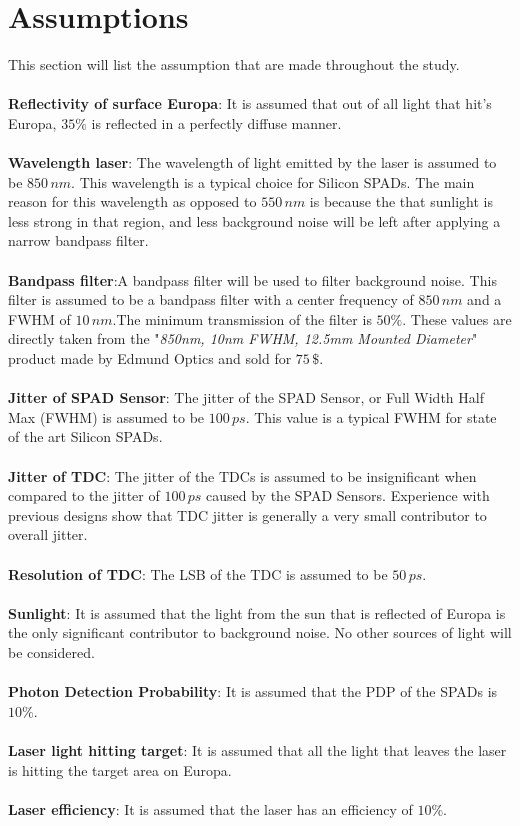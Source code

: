 \section{Assumptions} 
\label{ssec:assumptions}
This section will list the assumption that are made throughout the study.\\
\\
\textbf{Reflectivity of surface Europa}: It is assumed that out of all light that hit's Europa, $35\%$ is reflected in a perfectly diffuse manner.\\ 
\\
\textbf{Wavelength laser}: The wavelength of light emitted by the laser is assumed to be $850\,nm$. This wavelength is a typical choice for Silicon SPADs. The main reason for this wavelength as opposed to $550\,nm$ is because the that sunlight is less strong in that region, and less background noise will be left after applying a narrow bandpass filter. \\
\\
\textbf{Bandpass filter}:A bandpass filter will be used to filter background noise. This filter is assumed to be a bandpass filter with a center frequency of $850\,nm$ and a FWHM of $10\,nm$.The minimum transmission of the filter is $50\%$. These values are directly taken from the "\textit{850nm, 10nm FWHM, 12.5mm Mounted Diameter}" product made by Edmund Optics and sold for $75\,\$$.\\
\\
\textbf{Jitter of SPAD Sensor}: The jitter of the SPAD Sensor, or Full Width Half Max (FWHM) is assumed to be $100\,ps$. This value is a typical FWHM for state of the art Silicon SPADs. \\
\\
\textbf{Jitter of TDC}: The jitter of the TDCs is assumed to be insignificant when compared to the jitter of $100\,ps$ caused by the SPAD Sensors. Experience with previous designs show that TDC jitter is generally a very small contributor to overall jitter.\\
\\
\textbf{Resolution of TDC}: The LSB of the TDC is assumed to be $50\,ps$.\\
\\
\textbf{Sunlight}: It is assumed that the light from the sun that is reflected of Europa is the only significant contributor to background noise. No other sources of light will be considered. \\
\\
\textbf{Photon Detection Probability}: It is assumed that the PDP of the SPADs is $10\%$.\\
\\
\textbf{Laser light hitting target}: It is assumed that all the light that leaves the laser is hitting the target area on Europa.
\\
\\
\textbf{Laser efficiency}: It is assumed that the laser has an efficiency of $10\%$.

